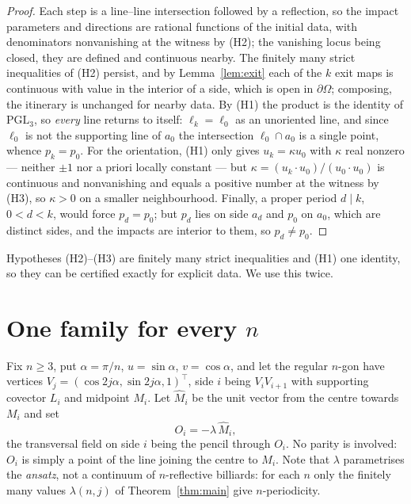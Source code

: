 \documentclass[11pt,a4paper]{article}
\theoremstyle{plain}
\theoremstyle{definition}
\theoremstyle{remark}
\newcommand{\PGL}{\mathrm{PGL}}
\begin{document}
\begin{proof}
Each step is a line--line intersection followed by a reflection, so the impact
parameters and directions are rational functions of the initial data, with
denominators nonvanishing at the witness by (H2); the vanishing locus being closed,
they are defined and continuous nearby. The finitely many strict inequalities of
(H2) persist, and by Lemma~\ref{lem:exit} each of the $k$ exit maps is continuous
with value in the interior of a side, which is open in $\partial\Omega$; composing,
the itinerary is unchanged for nearby data. By (H1) the product is the identity of
$\PGL_3$, so \emph{every} line returns to itself: $\ell_k=\ell_0$ as an unoriented
line, and since $\ell_0$ is not the supporting line of $a_0$ the intersection
$\ell_0\cap a_0$ is a single point, whence $p_k=p_0$. For the orientation, (H1)
only gives $u_k=\kappa u_0$ with $\kappa$ real nonzero --- neither $\pm1$ nor a
priori locally constant --- but $\kappa=(u_k\cdot u_0)/(u_0\cdot u_0)$ is
continuous and nonvanishing and equals a positive number at the witness by (H3), so
$\kappa>0$ on a smaller neighbourhood. Finally, a proper period $d\mid k$, $0<d<k$,
would force $p_d=p_0$; but $p_d$ lies on side $a_d$ and $p_0$ on $a_0$, which are
distinct sides, and the impacts are interior to them, so $p_d\neq p_0$.
\end{proof}

Hypotheses (H2)--(H3) are finitely many strict inequalities and (H1) one identity,
so they can be certified exactly for explicit data. We use this twice.

\section{One family for every $n$}

Fix $n\ge3$, put $\alpha=\pi/n$, $u=\sin\alpha$, $v=\cos\alpha$, and let the
regular $n$-gon have vertices $V_j=(\cos2j\alpha,\sin2j\alpha,1)^\top$, side $i$
being $V_iV_{i+1}$ with supporting covector $L_i$ and midpoint $M_i$. Let
$\widehat M_i$ be the unit vector from the centre towards $M_i$ and set
\begin{equation}\label{eq:Oi}
  O_i=-\lambda\,\widehat M_i ,
\end{equation}
the transversal field on side $i$ being the pencil through $O_i$. No parity is
involved: $O_i$ is simply a point of the line joining the centre to $M_i$. Note
that $\lambda$ parametrises the \emph{ansatz}, not a continuum of $n$-reflective
billiards: for each $n$ only the finitely many values $\lambda(n,j)$ of
Theorem~\ref{thm:main} give $n$-periodicity.
\end{document}
